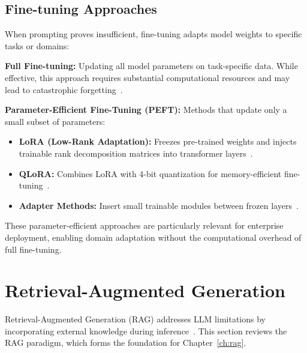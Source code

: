 \subsection{Fine-tuning Approaches}

When prompting proves insufficient, fine-tuning adapts model weights to specific tasks or domains:

\textbf{Full Fine-tuning:} Updating all model parameters on task-specific data. While effective, this approach requires substantial computational resources and may lead to catastrophic forgetting~\cite{mccloskey1989catastrophic}.

\textbf{Parameter-Efficient Fine-Tuning (PEFT):} Methods that update only a small subset of parameters:

\begin{itemize}[leftmargin=*]
    \item \textbf{LoRA (Low-Rank Adaptation):} Freezes pre-trained weights and injects trainable rank decomposition matrices into transformer layers~\cite{hu2022lora}.
    
    \item \textbf{QLoRA:} Combines LoRA with 4-bit quantization for memory-efficient fine-tuning~\cite{dettmers2023qlora}.
    
    \item \textbf{Adapter Methods:} Insert small trainable modules between frozen layers~\cite{houlsby2019adapters}.
\end{itemize}

These parameter-efficient approaches are particularly relevant for enterprise deployment, enabling domain adaptation without the computational overhead of full fine-tuning. %

\section{Retrieval-Augmented Generation}
\label{sec:lit_rag}

Retrieval-Augmented Generation (RAG) addresses LLM limitations by incorporating external knowledge during inference~\cite{lewis2020rag}. This section reviews the RAG paradigm, which forms the foundation for Chapter~\ref{ch:rag}.

